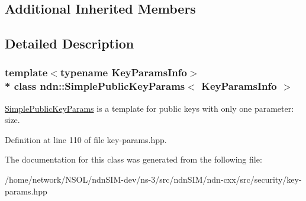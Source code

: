 \subsection*{Additional Inherited Members}


\subsection{Detailed Description}
\subsubsection*{template$<$typename Key\+Params\+Info$>$\\*
class ndn\+::\+Simple\+Public\+Key\+Params$<$ Key\+Params\+Info $>$}

\hyperlink{classndn_1_1SimplePublicKeyParams}{Simple\+Public\+Key\+Params} is a template for public keys with only one parameter\+: size. 

Definition at line 110 of file key-\/params.\+hpp.



The documentation for this class was generated from the following file\+:\begin{DoxyCompactItemize}
\item 
/home/network/\+N\+S\+O\+L/ndn\+S\+I\+M-\/dev/ns-\/3/src/ndn\+S\+I\+M/ndn-\/cxx/src/security/key-\/params.\+hpp\end{DoxyCompactItemize}
